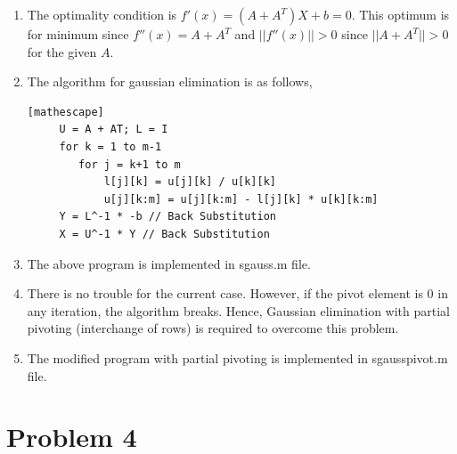 \documentclass[12pt,letterpaper]{article}
\begin{document}
\begin{enumerate}
	\item The optimality condition is $f'(x) = (A + A^T)X + b = 0$. This optimum is for minimum since $f''(x) = A + A^T$ and $||f''(x)|| > 0$ since $||A + A^T|| > 0$ for the given $A$.
	\item The algorithm for gaussian elimination is as follows,
	 \begin{lstlisting}[style = Python][mathescape]
	 U = A + AT; L = I
	 for k = 1 to m-1
	 	for j = k+1 to m
	 		l[j][k] = u[j][k] / u[k][k]
	 		u[j][k:m] = u[j][k:m] - l[j][k] * u[k][k:m]
	 Y = L^-1 * -b // Back Substitution
	 X = U^-1 * Y // Back Substitution
	 \end{lstlisting}
	\item The above program is implemented in sgauss.m file.
	\item There is no trouble for the current case. However, if the pivot element is $0$ in any iteration, the algorithm breaks. Hence, Gaussian elimination with partial pivoting (interchange of rows) is required to overcome this problem.
	\item The modified program with partial pivoting is implemented in sgausspivot.m file.
\end{enumerate}

\section*{Problem 4}
\end{document}
